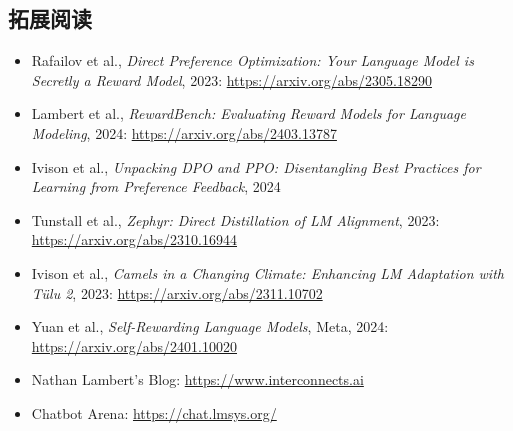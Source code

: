 \documentclass[a4paper]{article}
\begin{document}
\subsection{拓展阅读}

\begin{itemize}
    \item Rafailov et al., \textit{Direct Preference Optimization: Your Language Model is Secretly a Reward Model}, 2023: \url{https://arxiv.org/abs/2305.18290}
    \item Lambert et al., \textit{RewardBench: Evaluating Reward Models for Language Modeling}, 2024: \url{https://arxiv.org/abs/2403.13787}
    \item Ivison et al., \textit{Unpacking DPO and PPO: Disentangling Best Practices for Learning from Preference Feedback}, 2024
    \item Tunstall et al., \textit{Zephyr: Direct Distillation of LM Alignment}, 2023: \url{https://arxiv.org/abs/2310.16944}
    \item Ivison et al., \textit{Camels in a Changing Climate: Enhancing LM Adaptation with T\"ulu 2}, 2023: \url{https://arxiv.org/abs/2311.10702}
    \item Yuan et al., \textit{Self-Rewarding Language Models}, Meta, 2024: \url{https://arxiv.org/abs/2401.10020}
    \item Nathan Lambert's Blog: \url{https://www.interconnects.ai}
    \item Chatbot Arena: \url{https://chat.lmsys.org/}
\end{itemize}
\end{document}

